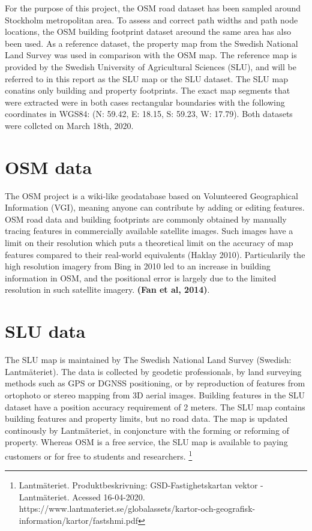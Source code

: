 \documentclass{kththesis}
\begin{document}
For the purpose of this project, the OSM road dataset has been sampled around Stockholm metropolitan area.
To assess and correct path widths and path node locations, the OSM building footprint dataset areound the same area has also been used.
As a reference dataset, the property map from the Swedish National Land Survey was used in comparison with the OSM map.
The reference map is provided by the Swedish University of Agricultural Sciences (SLU), and will be referred to in this report as the SLU map or the SLU dataset.
The SLU map conatins only building and property footprints.
The exact map segments that were extracted were in both cases rectangular boundaries with the following coordinates in WGS84: (N: 59.42, E: 18.15, S: 59.23, W: 17.79).
Both datasets were collcted on March 18th, 2020.

\section{OSM data}

The OSM project is a wiki-like geodatabase based on Volunteered Geographical Information (VGI), meaning anyone can contribute by adding or editing features.
OSM road data and building footprints are commonly obtained by manually tracing features in commercially available satellite images.
Such images have a limit on their resolution which puts a theoretical limit on the accuracy of map features compared to their real-world equivalents (Haklay 2010).
Particularily the high resolution imagery from Bing in 2010 led to an increase in building information in OSM, and the positional error is largely due to the limited resolution in such satellite imagery. \textbf{(Fan et al, 2014)}.

\section{SLU data}

The SLU map is maintained by The Swedish National Land Survey (Swedish: Lantmäteriet).
The data is collected by geodetic professionals, by land surveying methods such as GPS or DGNSS positioning, or by reproduction of features from ortophoto or stereo mapping from 3D aerial images.
Building features in the SLU dataset have a position accuracy requirement of 2 meters.
The SLU map contains building features and property limits, but no road data.
The map is updated continously by Lantmäteriet, in conjoncture with the forming or reforming of property.
Whereas OSM is a free service, the SLU map is available to paying customers or for free to students and researchers. \footnote{Lantmäteriet. Produktbeskrivning: GSD-Fastighetskartan vektor - Lantmäteriet. Acessed 16-04-2020. https://www.lantmateriet.se/globalassets/kartor-och-geografisk-information/kartor/fastshmi.pdf}
\end{document}
